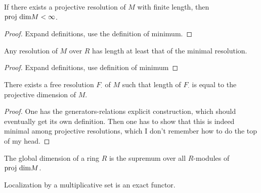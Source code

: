 \begin{lemma}
  \label{lem:finite_resl_implies_finite_projdim}
  If there exists a projective resolution of
  $M$ with finite length, then 
  $\text{proj dim} M < \infty$.
\end{lemma}

\begin{proof}
  Expand definitions, use the definition of minimum.
\end{proof}

\begin{lemma}
  \label{lem:min_resl_has_min_length}
  Any resolution of $M$ over $R$ has 
  length at least that of the minimal resolution.
\end{lemma}

\begin{proof}
  Expand definitions, use definition of minimum
\end{proof}

\begin{proposition}
  \label{prop:existence_min_free_resl}
  There exists a free resolution $F_\cdot$
  of $M$ such that length of $F_\cdot$
  is equal to the projective dimension of $M$.
\end{proposition}

\begin{proof}
  One has the generators-relations explicit construction,
  which should eventually get its own definition.
  Then one has to show that this is indeed minimal among
  projective resolutions, which I don't remember how to do
  the top of my head.
\end{proof}


\begin{definition}
  \label{def:globdim}
  The global dimension of a ring $R$
  is the supremum over all $R$-modules
  of $\text{proj dim} M$.
\end{definition}


\begin{lemma}
  \label{lem:loczn_exact}
  Localization by a multiplicative set is an exact functor.
\end{lemma}

